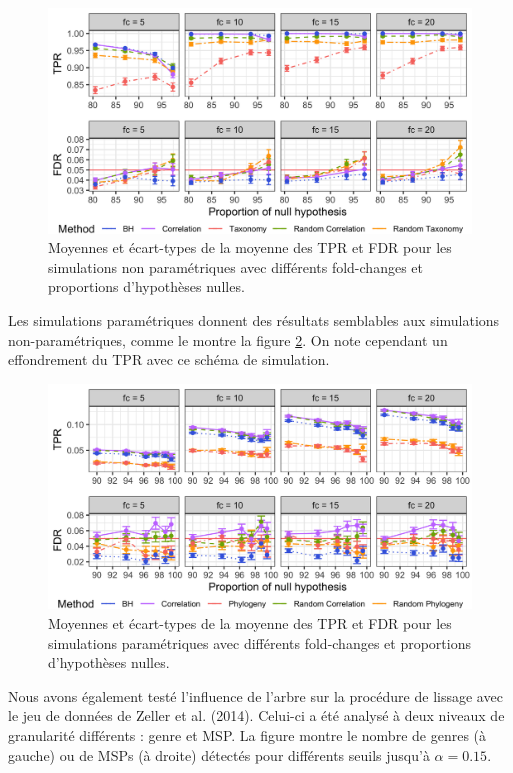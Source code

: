 \documentclass[12pt,a4paper]{reedthesis}
\theoremstyle{definition}
\theoremstyle{definition}
\theoremstyle{definition}
\theoremstyle{remark}
\begin{document}
\begin{figure}[!t]

{\centering \includegraphics[width=0.9\linewidth]{img/tprfdr_cor_np} 

}

\caption{Moyennes et écart-types de la moyenne des TPR et FDR pour les simulations non paramétriques avec différents fold-changes et proportions d'hypothèses nulles.}\label{fig:tprfdrcornp}
\end{figure}
Les simulations paramétriques donnent des résultats semblables aux simulations non-paramétriques, comme le montre la figure \ref{fig:tprfdrcorp}. On note cependant un effondrement du TPR avec ce schéma de simulation.


\begin{figure}[!t]

{\centering \includegraphics[width=0.9\linewidth]{img/tprfdr_cor_p} 

}

\caption{Moyennes et écart-types de la moyenne des TPR et FDR pour les simulations paramétriques avec différents fold-changes et proportions d'hypothèses nulles.}\label{fig:tprfdrcorp}
\end{figure}
Nous avons également testé l'influence de l'arbre sur la procédure de lissage avec le jeu de données de Zeller et al. (2014). Celui-ci a été analysé à deux niveaux de granularité différents : genre et MSP. La figure montre le nombre de genres (à gauche) ou de MSPs (à droite) détectés pour différents seuils jusqu'à \(\alpha = 0.15\).
\end{document}
